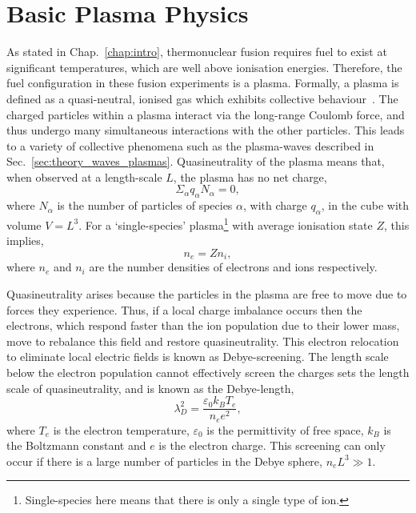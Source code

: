 \section{Basic Plasma Physics}%
\label{sec:theory_plasma_phys}

As stated in Chap.~\ref{chap:intro}, thermonuclear fusion requires fuel to exist at significant temperatures, which are well above ionisation energies.
Therefore, the fuel configuration in these fusion experiments is a plasma.
Formally, a plasma is defined as a quasi-neutral, ionised gas which exhibits collective behaviour~\cite{chen_introduction_2018}.
The charged particles within a plasma interact via the long-range Coulomb force, and thus undergo many simultaneous interactions with the other particles.
This leads to a variety of collective phenomena such as the plasma-waves described in Sec.~\ref{sec:theory_waves_plasmas}.
Quasineutrality of the plasma means that, when observed at a length-scale $L$, the plasma has no net charge,
\begin{equation}
    \Sigma_{\alpha}q_{\alpha}N_{\alpha} = 0,
\end{equation}
where $N_{\alpha}$ is the number of particles of species $\alpha$, with charge $q_{\alpha}$, in the cube with volume $V=L^3$.
For a `single-species' plasma\footnote{Single-species here means that there is only a single type of ion.} with average ionisation state $Z$, this implies,
\begin{equation}
    n_e = Z n_i,
\end{equation}
where $n_e$ and $n_i$ are the number densities of electrons and ions respectively.

Quasineutrality arises because the particles in the plasma are free to move due to forces they experience.
Thus, if a local charge imbalance occurs then the electrons, which respond faster than the ion population due to their lower mass, move to rebalance this field and restore quasineutrality.
This electron relocation to eliminate local electric fields is known as Debye-screening.
The length scale below the electron population cannot effectively screen the charges sets the length scale of quasineutrality, and is known as the Debye-length,
\begin{equation}
    \lambda_{D}^2 = \frac{\varepsilon_0 k_B T_e}{n_e e^2},
\end{equation}
where $T_e$ is the electron temperature, $\varepsilon_0$ is the permittivity of free space, $k_B$ is the Boltzmann constant and $e$ is the electron charge.
This screening can only occur if there is a large number of particles in the Debye sphere, $n_e L^3\gg 1$.

